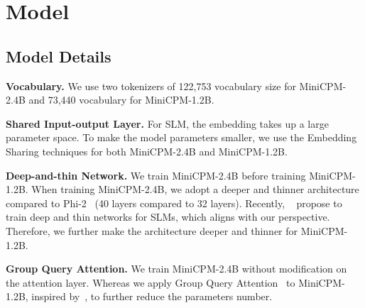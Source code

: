 \section{Model}
 
\label{sec:model}
\begin{table}[htbp]
    \centering
{}
    \caption{Model configurations for MiniCPM. N (B), $d_m$, $d_{ff}$, $d_h$, $n_q$, $n_{kv}$, $L$, Batch size (M), Tokens (T) represents the number of non-embedding parameters of the model, model hidden dimension, feedforward layer bottleneck dimension, attention head dimension, number of queries, number key/values, number of layers, training batch size, total training tokens.}
    \label{tab:model_configs}
\end{table}

\subsection{Model Details}
\noindent\textbf{Vocabulary.} We use two tokenizers of 122,753 vocabulary size for MiniCPM-2.4B and 73,440 vocabulary for MiniCPM-1.2B.

\noindent\textbf{Shared Input-output Layer.}
For SLM, the embedding takes up a large parameter space. To make the model parameters smaller, we use the Embedding Sharing techniques for both MiniCPM-2.4B and MiniCPM-1.2B. 

\noindent\textbf{Deep-and-thin Network.} We train MiniCPM-2.4B before training MiniCPM-1.2B. When training MiniCPM-2.4B, we adopt a deeper and thinner architecture compared to Phi-2~\citep{Javaheripi2023Phi2} (40 layers compared to 32 layers). Recently, ~\cite{liu2024mobilellm} propose to train deep and thin networks for SLMs, which aligns with our perspective. Therefore, we further make the architecture deeper and thinner for MiniCPM-1.2B. 

\noindent\textbf{Group Query Attention.} We train MiniCPM-2.4B without modification on the attention layer. Whereas we apply Group Query Attention~\citep{ainslie-etal-2023-gqa} to MiniCPM-1.2B, inspired by~\cite{liu2024mobilellm}, to further reduce the parameters number.

